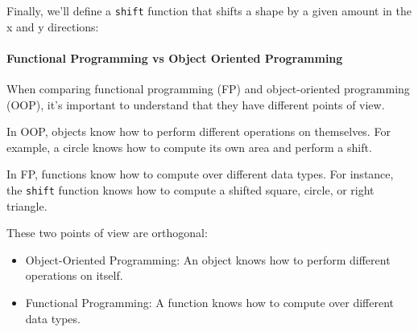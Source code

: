 Finally, we'll define a \texttt{shift} function that shifts a shape by a
given amount in the x and y directions:

\begin{Shaded}
\begin{Highlighting}[]
  \OtherTok{{-}\textgreater{}}  \OtherTok{{-}\textgreater{}}  \OtherTok{{-}\textgreater{}} 
\OtherTok{=} 
    \OtherTok{{-}\textgreater{}} \OperatorTok{+}\OperatorTok{+}
    \OtherTok{{-}\textgreater{}} \OperatorTok{+}\OperatorTok{+}
    \OtherTok{{-}\textgreater{}} 
    \OperatorTok{+}\OperatorTok{+}
\end{Highlighting}
\end{Shaded}

\hypertarget{functional-programming-vs-object-oriented-programming}{%
\paragraph{Functional Programming vs Object Oriented
Programming}\label{functional-programming-vs-object-oriented-programming}}

When comparing functional programming (FP) and object-oriented
programming (OOP), it's important to understand that they have different
points of view.

In OOP, objects know how to perform different operations on themselves.
For example, a circle knows how to compute its own area and perform a
shift.

In FP, functions know how to compute over different data types. For
instance, the \texttt{shift} function knows how to compute a shifted
square, circle, or right triangle.

These two points of view are orthogonal:

\begin{itemize}
\tightlist
\item
  Object-Oriented Programming: An object knows how to perform different
  operations on itself.
\item
  Functional Programming: A function knows how to compute over different
  data types.
\end{itemize}

